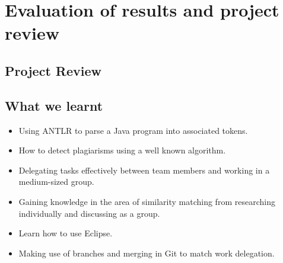 \section{Evaluation of results and project review}

\subsection{Project Review}
\subsection{What we learnt}
\begin{itemize}
\item Using ANTLR to parse a Java program into associated tokens. 
\item How to detect plagiarisms using a well known algorithm.
\item Delegating tasks effectively between team members and working in a medium-sized group.
\item Gaining knowledge in the area of similarity matching from researching individually and discussing as a group.
\item Learn how to use Eclipse.
\item Making use of branches and merging in Git to match work delegation.
\end{itemize}
\break